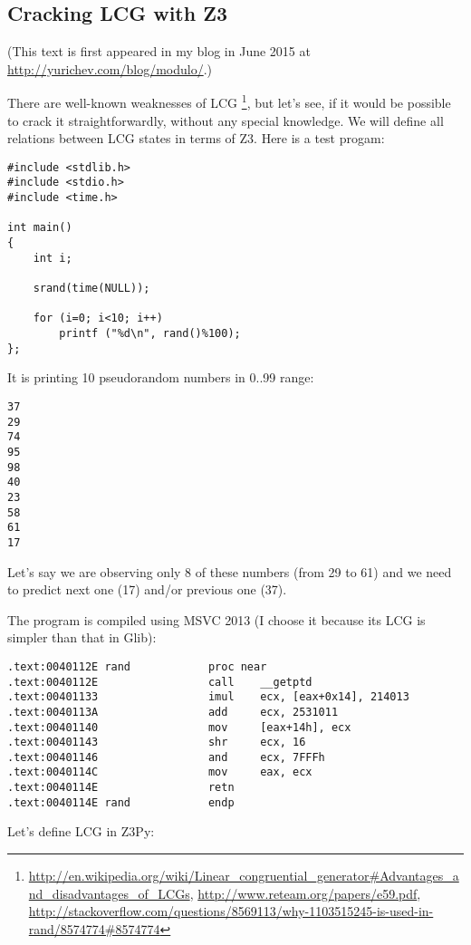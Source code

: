\subsection{Cracking \ac{LCG} with Z3}

(This text is first appeared in my blog in June 2015 at \url{http://yurichev.com/blog/modulo/}.)

There are well-known weaknesses of \ac{LCG}
\footnote{\url{http://en.wikipedia.org/wiki/Linear_congruential_generator\#Advantages_and_disadvantages_of_LCGs},
\url{http://www.reteam.org/papers/e59.pdf},
\url{http://stackoverflow.com/questions/8569113/why-1103515245-is-used-in-rand/8574774\#8574774}},
but let's see, if it would be possible to crack it straightforwardly, without any special knowledge.
We will define all relations between LCG states in terms of Z3.
Here is a test progam:

\begin{lstlisting}
#include <stdlib.h>
#include <stdio.h>
#include <time.h>

int main()
{
	int i;

	srand(time(NULL));

	for (i=0; i<10; i++)
		printf ("%d\n", rand()%100);
};
\end{lstlisting}

It is printing 10 pseudorandom numbers in 0..99 range:

\begin{lstlisting}
37
29
74
95
98
40
23
58
61
17
\end{lstlisting}

Let's say we are observing only 8 of these numbers (from 29 to 61) and we need to predict next one (17) and/or previous one (37).

The program is compiled using MSVC 2013 (I choose it because its LCG is simpler than that in Glib):

\begin{lstlisting}
.text:0040112E rand            proc near
.text:0040112E                 call    __getptd
.text:00401133                 imul    ecx, [eax+0x14], 214013
.text:0040113A                 add     ecx, 2531011
.text:00401140                 mov     [eax+14h], ecx
.text:00401143                 shr     ecx, 16
.text:00401146                 and     ecx, 7FFFh
.text:0040114C                 mov     eax, ecx
.text:0040114E                 retn
.text:0040114E rand            endp
\end{lstlisting}

Let's define \ac{LCG} in Z3Py:

